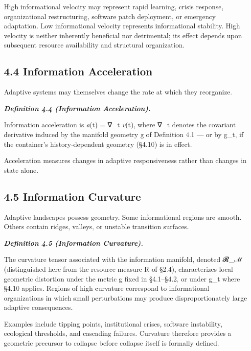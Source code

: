 \documentclass[
]{article}
\begin{document}
High informational velocity may represent rapid learning, crisis
response, organizational restructuring, software patch deployment, or
emergency adaptation. Low informational velocity represents
informational stability. High velocity is neither inherently beneficial
nor detrimental; its effect depends upon subsequent resource
availability and structural organization.

\hypertarget{information-acceleration}{%
\subsection{4.4 Information
Acceleration}\label{information-acceleration}}

Adaptive systems may themselves change the rate at which they
reorganize.

\emph{\textbf{Definition 4.4 (Information Acceleration).}}

Information acceleration is \emph{a}(t) = ∇\_t \emph{v}(t), where ∇\_t
denotes the covariant derivative induced by the manifold geometry g of
Definition 4.1 --- or by g\_t, if the container's history-dependent
geometry (§4.10) is in effect.

Acceleration measures changes in adaptive responsiveness rather than
changes in state alone.

\hypertarget{information-curvature}{%
\subsection{4.5 Information Curvature}\label{information-curvature}}

Adaptive landscapes possess geometry. Some informational regions are
smooth. Others contain ridges, valleys, or unstable transition surfaces.

\emph{\textbf{Definition 4.5 (Information Curvature).}}

The curvature tensor associated with the information manifold, denoted
𝓡\_ℳ (distinguished here from the resource measure R of §2.4),
characterizes local geometric distortion under the metric g fixed in
§4.1--§4.2, or under g\_t where §4.10 applies. Regions of high curvature
correspond to informational organizations in which small perturbations
may produce disproportionately large adaptive consequences.

Examples include tipping points, institutional crises, software
instability, ecological thresholds, and cascading failures. Curvature
therefore provides a geometric precursor to collapse before collapse
itself is formally defined.
\end{document}
